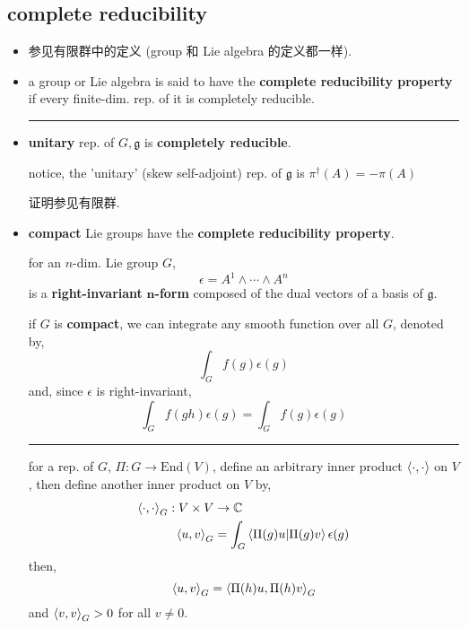 \subsection{complete reducibility}
\begin{itemize}
	\item 参见有限群中的定义 (group 和 Lie algebra 的定义都一样).
	
	\item a group or Lie algebra is said to have the \textbf{complete reducibility property} if every finite-dim. rep. of it is completely reducible.
	
	\noindent\rule[0.5ex]{\linewidth}{0.5pt} %
	
	\item \textbf{unitary} rep. of $G, \mathfrak{g}$ is \textbf{completely reducible}.
	
	notice, the 'unitary' (skew self-adjoint) rep. of $\mathfrak{g}$ is $\pi^\dag(A) = - \pi(A)$
	
	证明参见有限群.
	
	\item \textbf{compact} Lie groups have the \textbf{complete reducibility property}.
	
	\begin{tcolorbox}[title=proof:]
		for an $n$-dim. Lie group $G$,
		\begin{equation}
			\epsilon = A^1 \wedge \cdots \wedge A^n
		\end{equation}
		is a \textbf{right-invariant} $\boldsymbol{n}$\textbf{-form} composed of the dual vectors of a basis of $\mathfrak{g}$.
		
		if $G$ is \textbf{compact}, we can integrate any smooth function over all $G$, denoted by,
		\begin{equation}
			\int_G f(g) \epsilon(g)
		\end{equation}
		and, since $\epsilon$ is right-invariant,
		\begin{equation}
			\int_G f(g h) \epsilon(g) = \int_G f(g) \epsilon(g)
		\end{equation}
		
		\noindent\rule[0.5ex]{\linewidth}{0.5pt} %
		
		for a rep. of $G$, $\Pi : G \rightarrow \mathrm{End}(V)$, define an arbitrary inner product $\braket{\cdot, \cdot}$ on $V$, then define another inner product on $V$ by,
		\begin{align}
			\braket{\cdot, \cdot}_G : V \times V & \rightarrow \mathbb{C} \notag \\
			\braket{u, v}_G &= \int_G \braket{\Pi(g) u | \Pi(g) v} \epsilon(g) \label{5.2.14}
		\end{align}
		then,
		\begin{equation}
			\braket{u, v}_G = \braket{\Pi(h) u, \Pi(h) v}_G
		\end{equation}
		and $\braket{v, v}_G > 0$ for all $v \neq 0$.
		

\end{tcolorbox}
\end{itemize}

